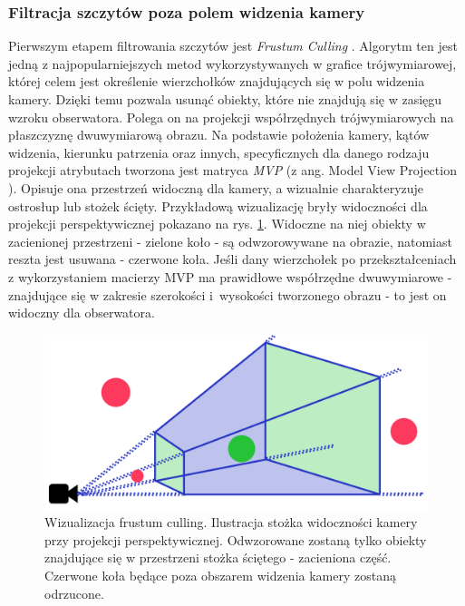 \subsubsection{Filtracja szczytów poza polem widzenia kamery} \label{sec:frustum}

Pierwszym etapem filtrowania szczytów jest \textit{Frustum Culling} \cite{frutsum_culling}. Algorytm ten jest jedną z najpopularniejszych metod wykorzystywanych w grafice trójwymiarowej, której celem jest określenie wierzchołków znajdujących się w polu widzenia kamery. Dzięki temu pozwala usunąć obiekty, które nie znajdują się w zasięgu wzroku obserwatora. Polega on na projekcji współrzędnych trójwymiarowych na płaszczyznę dwuwymiarową obrazu. Na podstawie położenia kamery, kątów widzenia, kierunku patrzenia oraz innych, specyficznych dla danego rodzaju projekcji atrybutach tworzona jest matryca \textit{MVP} (z ang. Model View Projection \cite{MVP_matrices}). Opisuje ona przestrzeń widoczną dla kamery, a wizualnie charakteryzuje ostrosłup lub stożek ścięty. Przykładową wizualizację bryły widoczności dla projekcji perspektywicznej pokazano na rys. \ref{fig:frutsum-test}. Widoczne na niej obiekty w zacienionej przestrzeni - zielone koło - są odwzorowywane na obrazie, natomiast reszta jest usuwana - czerwone koła. Jeśli dany wierzchołek po przekształceniach z wykorzystaniem macierzy MVP ma prawidłowe współrzędne dwuwymiarowe - znajdujące się w zakresie szerokości i~wysokości tworzonego obrazu - to jest on widoczny dla obserwatora. 

\begin{figure}[!h]
    \centering \includegraphics[width=0.95\linewidth]{img/frutsum_test.png}
    \caption{Wizualizacja frustum culling. Ilustracja stożka widoczności kamery przy projekcji perspektywicznej. Odwzorowane zostaną tylko obiekty znajdujące się w przestrzeni stożka ściętego - zacieniona część. Czerwone koła będące poza obszarem widzenia kamery zostaną odrzucone. }
    \label{fig:frutsum-test}
\end{figure}


